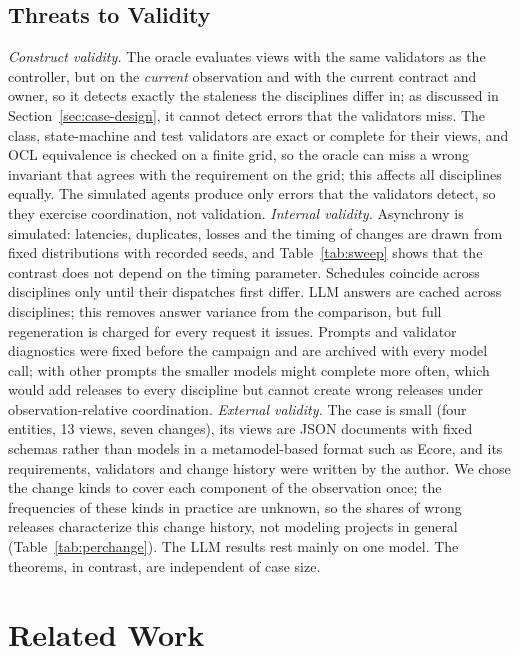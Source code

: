 \documentclass[pdflatex,sn-mathphys-num]{sn-jnl}
\theoremstyle{thmstyleone}%
\theoremstyle{thmstyletwo}%
\theoremstyle{thmstylethree}%
\begin{document}
\subsection{Threats to Validity}\label{sec:threats}
\emph{Construct validity.} The oracle evaluates views with the same validators as the controller, but on the \emph{current} observation and with the current contract and owner, so it detects exactly the staleness the disciplines differ in; as discussed in Section~\ref{sec:case-design}, it cannot detect errors that the validators miss. The class, state-machine and test validators are exact or complete for their views, and OCL equivalence is checked on a finite grid, so the oracle can miss a wrong invariant that agrees with the requirement on the grid; this affects all disciplines equally. The simulated agents produce only errors that the validators detect, so they exercise coordination, not validation.
\emph{Internal validity.} Asynchrony is simulated: latencies, duplicates, losses and the timing of changes are drawn from fixed distributions with recorded seeds, and Table~\ref{tab:sweep} shows that the contrast does not depend on the timing parameter. Schedules coincide across disciplines only until their dispatches first differ. LLM answers are cached across disciplines; this removes answer variance from the comparison, but full regeneration is charged for every request it issues. Prompts and validator diagnostics were fixed before the campaign and are archived with every model call; with other prompts the smaller models might complete more often, which would add releases to every discipline but cannot create wrong releases under observation-relative coordination.
\emph{External validity.} The case is small (four entities, 13 views, seven changes), its views are JSON documents with fixed schemas rather than models in a metamodel-based format such as Ecore, and its requirements, validators and change history were written by the author. We chose the change kinds to cover each component of the observation once; the frequencies of these kinds in practice are unknown, so the shares of wrong releases characterize this change history, not modeling projects in general (Table~\ref{tab:perchange}). The LLM results rest mainly on one model. The theorems, in contrast, are independent of case size.

\section{Related Work}\label{sec:related}
\end{document}
